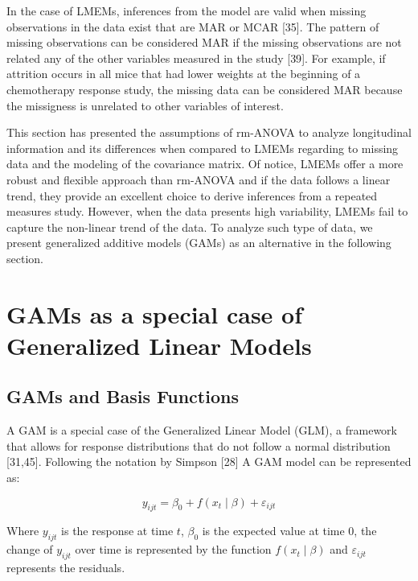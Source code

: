 \documentclass[
]{article}
\begin{document}
In the case of LMEMs, inferences from the model are valid when missing observations in the data exist that are MAR or MCAR {[}35{]}. The pattern of missing observations can be considered MAR if the missing observations are not related any of the other variables measured in the study {[}39{]}. For example, if attrition occurs in all mice that had lower weights at the beginning of a chemotherapy response study, the missing data can be considered MAR because the missigness is unrelated to other variables of interest.

This section has presented the assumptions of rm-ANOVA to analyze longitudinal information and its differences when compared to LMEMs regarding to missing data and the modeling of the covariance matrix. Of notice, LMEMs offer a more robust and flexible approach than rm-ANOVA and if the data follows a linear trend, they provide an excellent choice to derive inferences from a repeated measures study. However, when the data presents high variability, LMEMs fail to capture the non-linear trend of the data. To analyze such type of data, we present generalized additive models (GAMs) as an alternative in the following section.

\hypertarget{gams-as-a-special-case-of-generalized-linear-models}{%
\section{GAMs as a special case of Generalized Linear Models}\label{gams-as-a-special-case-of-generalized-linear-models}}

\hypertarget{gams-and-basis-functions}{%
\subsection{GAMs and Basis Functions}\label{gams-and-basis-functions}}

A GAM is a special case of the Generalized Linear Model (GLM), a framework that allows for response distributions that do not follow a normal distribution {[}31,45{]}. Following the notation by Simpson {[}28{]} A GAM model can be represented as:

\begin{equation}
  y_{ijt}=\beta_0+f(x_t\mid \beta)+\varepsilon_{ijt}
  \label{eq:GAM}
\end{equation}

Where \(y_{ijt}\) is the response at time \(t\), \(\beta_0\) is the expected value at time 0, the change of \(y_{ijt}\) over time is represented by the function \(f(x_t\mid \beta)\) and \(\varepsilon_{ijt}\) represents the residuals.
\end{document}
